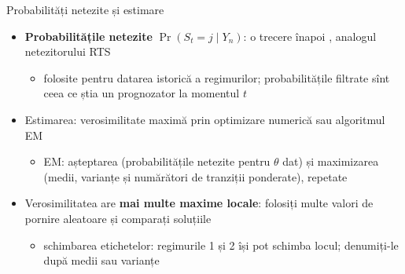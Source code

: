 \begin{frame}{Probabilități netezite și estimare}
\itemsize{\small}
\begin{itemize}
    \item \textbf{Probabilitățile netezite} $\Pr(S_t = j \mid Y_n)$: o trecere înapoi , analogul netezitorului RTS
    \begin{itemize}
        \item folosite pentru datarea istorică a regimurilor; probabilitățile filtrate sînt ceea ce știa un prognozator la momentul $t$
    \end{itemize}
    \item Estimarea: verosimilitate maximă prin optimizare numerică sau algoritmul EM 
    \begin{itemize}
        \item EM: așteptarea (probabilitățile netezite pentru $\theta$ dat) și maximizarea (medii, varianțe și numărători de tranziții ponderate), repetate
    \end{itemize}
    \item Verosimilitatea are \textbf{mai multe maxime locale}: folosiți multe valori de pornire aleatoare și comparați soluțiile
    \begin{itemize}
        \item schimbarea etichetelor: regimurile 1 și 2 își pot schimba locul; denumiți-le după medii sau varianțe
    \end{itemize}
\end{itemize}
\end{frame}

